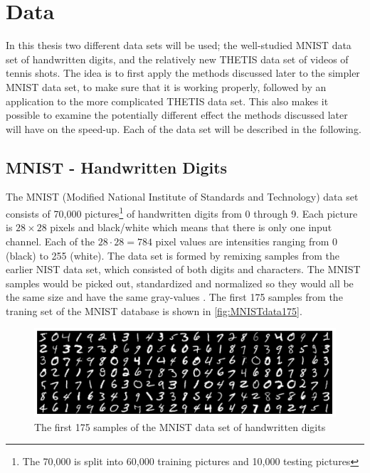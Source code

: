 \section{Data} \label{tex:data}

In this thesis two different data sets will be used; the well-studied MNIST data set \cite{MNIST} of handwritten digits, and the relatively new THETIS data set \cite{Gourgari2013} of videos of tennis shots. The idea is to first apply the methods discussed later to the simpler MNIST data set, to make sure that it is working properly, followed by an application to the more complicated THETIS data set. This also makes it possible to examine the potentially different effect the methods discussed later will have on the speed-up. Each of the data set will be described in the following. 

\subsection{MNIST - Handwritten Digits}
The MNIST (Modified National Institute of Standards and Technology) data set \cite{MNIST} consists of 70,000 pictures\footnote{The 70,000 is split into 60,000 training pictures and 10,000 testing pictures} of handwritten digits from 0 through 9. Each picture is $28\times 28$ pixels and black/white which means that there is only one input channel. Each of the $28\cdot 28 = 784$ pixel values are intensities ranging from 0 (black) to 255 (white). The data set is formed by remixing samples from the earlier NIST data set, which consisted of both digits and characters. The MNIST samples would be picked out, standardized and normalized so they would all be the same size and have the same gray-values \cite{mnistdatabase}. The first 175 samples from the traning set of the MNIST database is shown in \autoref{fig:MNISTdata175}. 

\begin{figure}[H]
    \centering
    \includegraphics[width=\linewidth]{Pics/04_Data/MNIST.png}
    \caption{The first 175 samples of the MNIST data set of handwritten digits}
    \label{fig:MNISTdata175}
\end{figure}

